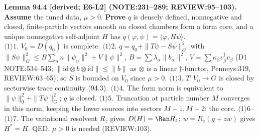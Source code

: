 \textbf{Lemma 94.4 [derived; E6-L2] (NOTE:231--289; REVIEW:95--103).}  \textbf{Assume} the tuned data, \(\mu>0\).
\textbf{Prove} \(q\) is densely defined, nonnegative and closed, finite-particle vectors smooth on closed chambers form a
form core, and a unique nonnegative self-adjoint \(H\) has \(q(\varphi,\psi)=\langle\varphi,H\psi\rangle\).\\
\(\langle1\rangle1\). \(V_0=D(q_0)\) is complete.  \(\langle1\rangle2\). \(q=q_0+\|T\psi-S\psi\|_G^2\) with
\(\|S\psi\|_G^2\le B\sum_nn\|\psi_n\|^2+V\|\psi\|^2\), \(B=\sum\lambda_\alpha\|b_\alpha\|^2\), \(V=\sum\kappa_\beta v_\beta^\dagger v_\beta\) (D1
NOTE:534--543; \(\|\mathrm{id}\otimes b\otimes\mathrm{id}\|\le\|b\|\) as \(\otimes\) is a linear \(\dagger\)-functor, Penneys:319, REVIEW:63--65);
so \(S\) is bounded on \(V_0\) since \(\mu>0\).  \(\langle1\rangle3\). \(T:V_0\to G\) is closed by sectorwise trace continuity (94.3).
\(\langle1\rangle4\). The form norm is equivalent to \(\|\psi\|_0^2+\|T\psi\|_G^2\); \(q\) is closed.  \(\langle1\rangle5\). Truncation at particle number
\(M\) converges in this norm, keeping the lower sources into sectors \(M{+}1,M{+}2\): the core.  \(\langle1\rangle6\)--\(\langle1\rangle7\). The
variational resolvent \(R_z\) gives \(D(H)=\Ran R_z\); \(w=R_z(g+zw)\) gives \(H^*=H\).  QED.  \(\mu>0\) is needed (REVIEW:103).

